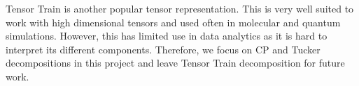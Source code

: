 \documentclass[a4paper,11pt, margin=2cm]{article}
\begin{document}
	
	
	
	
	Tensor Train is another popular tensor representation. This is very well suited to work with high dimensional tensors and used often in molecular and quantum simulations. However, this has limited use in data analytics as it is hard to interpret its different components. Therefore, we focus on CP and Tucker decompositions in this project and leave Tensor Train decomposition for future work. 
	
	
	
	
	
	
\end{document}
